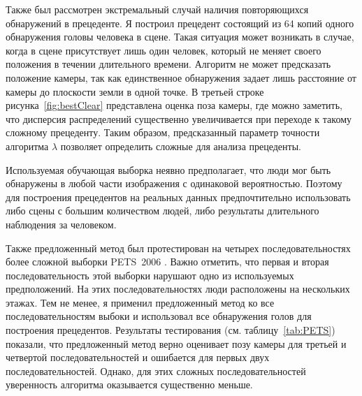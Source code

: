 Также был рассмотрен экстремальный случай наличия повторяющихся обнаружений в прецеденте. Я построил прецедент состоящий из 64 копий одного обнаружения головы человека в сцене. Такая ситуация может возникать в случае, когда в сцене присутствует лишь один человек, который не меняет своего положения в течении длительного времени. Алгоритм не может предсказать положение камеры, так как единственное обнаружения задает лишь расстояние от камеры до плоскости земли в одной точке. В третьей строке рисунка~\ref{fig:bestClear} представлена оценка поза камеры, где можно заметить, что дисперсия распределений существенно увеличивается при переходе к такому сложному прецеденту. Таким образом, предсказанный параметр точности алгоритма $\lambda$ позволяет определить сложные для анализа прецеденты.

Используемая обучающая выборка неявно предполагает, что люди мог быть обнаружены в любой части изображения с одинаковой вероятностью. Поэтому для построения прецедентов на реальных данных предпочтительно использовать либо сцены с большим количеством людей, либо результаты длительного наблюдения за человеком.

Также предложенный метод был протестирован на четырех последовательностях более сложной выборки PETS~2006 \cite{thirde2006overview}. Важно отметить, что первая и вторая последовательность этой выборки нарушают одно из используемых предположений. На этих последовательностях люди расположены на нескольких этажах. Тем не менее, я применил предложенный метод ко все последовательностям выбоки и использовал все обнаружения голов для построения прецедентов. Результаты тестирования (см. таблицу~\ref{tab:PETS}) показали, что предложенный метод верно оценивает позу камеры для третьей и четвертой последовательностей и ошибается для первых двух последовательностей. Однако, для этих сложных последовательностей уверенность алгоритма оказывается существенно меньше.

